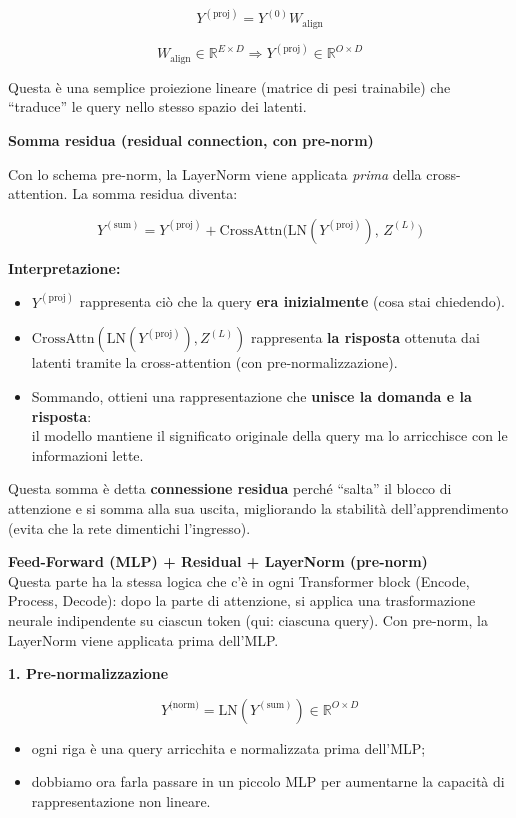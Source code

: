\documentclass[
  11pt,
]{article}
\begin{document}
\[Y^{(\text{proj})} = Y^{(0)}W_{\text{align}}
\]

\[W_{\text{align}} \in \mathbb{R}^{E \times D} \Rightarrow Y^{(\text{proj})} \in \mathbb{R}^{O \times D}\]

Questa è una semplice proiezione lineare (matrice di pesi trainabile)
che ``traduce'' le query nello stesso spazio dei latenti.

\textbf{Somma residua (residual connection, con pre-norm)}

Con lo schema pre-norm, la LayerNorm viene applicata \emph{prima} della cross-attention. La somma residua diventa:

\[Y^{(\text{sum})} = Y^{(\text{proj})} + \text{CrossAttn}\!\bigl(\mathrm{LN}(Y^{(\text{proj})}),\, Z^{(L)}\bigr)
\]

\textbf{Interpretazione:}

\begin{itemize}
\item
  \(Y^{(\text{proj})}\) rappresenta ciò che la query \textbf{era
  inizialmente} (cosa stai chiedendo).
\item
  \(\text{CrossAttn}(\mathrm{LN}(Y^{(\text{proj})}), Z^{(L)})\) rappresenta \textbf{la risposta} ottenuta dai
  latenti tramite la cross-attention (con pre-normalizzazione).
\item
  Sommando, ottieni una rappresentazione che \textbf{unisce la domanda e
  la risposta}:\\
  il modello mantiene il significato originale della query ma lo
  arricchisce con le informazioni lette.
\end{itemize}

Questa somma è detta \textbf{connessione residua} perché ``salta'' il
blocco di attenzione e si somma alla sua uscita, migliorando la
stabilità dell'apprendimento (evita che la rete dimentichi l'ingresso).

\textbf{Feed-Forward (MLP) + Residual + LayerNorm (pre-norm)}\\
Questa parte ha la stessa logica che c'è in ogni
Transformer block (Encode, Process, Decode): dopo la parte di
attenzione, si applica una trasformazione neurale indipendente su
ciascun token (qui: ciascuna query). Con pre-norm, la LayerNorm viene applicata prima dell'MLP.

\textbf{1. Pre-normalizzazione}

\[Y^{\text{(norm)}} = \mathrm{LN}(Y^{(\text{sum})}) \in \mathbb{R}^{O \times D}\]

\begin{itemize}
\item
  ogni riga è una query arricchita e normalizzata prima dell'MLP;
\item
  dobbiamo ora farla passare in un piccolo MLP per aumentarne la
  capacità di rappresentazione non lineare.
\end{itemize}
\end{document}
